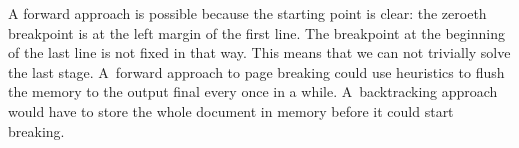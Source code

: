 A forward approach is possible because the starting point is clear:
the zeroeth breakpoint is at the left margin of the first line. The
breakpoint at the beginning of the last line is not fixed in that
way. This means that we can not trivially solve the last stage.
A~forward approach to page breaking could use heuristics to flush the
memory to the output final every once in a while. A~backtracking
approach would have to store the whole document in memory before it
could start breaking.
